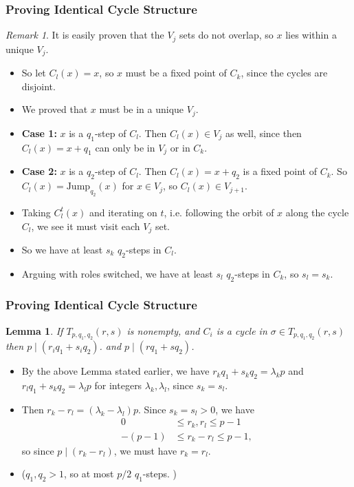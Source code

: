 \documentclass{beamer}
\theoremstyle{plain}
\newtheorem{lem}[theorem]{Lemma}
\theoremstyle{definition}
\theoremstyle{remark}
\newtheorem{rem}[theorem]{Remark}
\newcommand{\bee}{\begin{equation}\begin{aligned}}
\newcommand{\eee}{\end{aligned}\end{equation}}
\renewcommand{\leq}{\leqslant}			%
\renewcommand{\'}{\hspace{0.5mm}'}		%
\begin{document}

\begin{frame}
\frametitle{Proving Identical Cycle Structure}
	
	\begin{rem}
		It is easily proven that the $V_j$ sets do not 
		overlap, so $x$ lies within a unique $V_j$. 
	\end{rem}
	\begin{itemize}
		\item So let $C_l(x) = x$, so $x$ must be a fixed
		point of $C_k$, since the cycles are disjoint. 
		\item We proved that $x$ must be in a unique $V_j$. 
		\item \textbf{Case 1:} $x$ is a $q_1$-step of $C_l$. 
		Then $C_l(x) \in V_j$ as well, since then 
		$C_l(x) = x + q_1$ can only be in $V_j$ or in $C_k$. 
		\item \textbf{Case 2:} $x$ is a $q_2$-step of $C_l$. 
		Then $C_l(x) = x + q_2$ is a fixed point of $C_k$. 
		So $C_l(x) = \mathrm{Jump}_{q_2}(x)$ for $x \in V_j$, 
		so $C_l(x) \in V_{j + 1}$. 
		\item Taking $C_l^t(x)$ and iterating on $t$, 
		i.e. following the orbit of $x$ along the cycle
		$C_l$, we see it must visit each $V_j$ set. 
		\item 
		So we have at least $s_k$ $q_2$-steps in $C_l$.
		
		\item Arguing with roles switched, we have
		at least $s_l$ $q_2$-steps in $C_k$, so $s_l = s_k$. 
	\end{itemize}

\end{frame}



\begin{frame}
\frametitle{Proving Identical Cycle Structure}
	
	\begin{lem}
		If $T_{p,q_1,q_2}(r,s)$ is nonempty, 
		and $C_i$ is a cycle in $\sigma \in T_{p,q_1,q_2}(r,s)$
		then $p \mid (r_iq_1 + s_iq_2)$. 
		and $p \mid (rq_1 + sq_2)$. 
	\end{lem}
	\begin{itemize}
		\item By the above Lemma stated earlier, we have
		$r_kq_1 + s_kq_2 = \lambda_kp$ and 
		$r_lq_1 + s_kq_2 = \lambda_l p$ 
		for integers $\lambda_k,\lambda_l$, since $s_k = s_l$. 
		\item Then $r_k - r_l = (\lambda_k - \lambda_l)p$. 
		Since $s_k = s_l > 0$, we have
		\bee
			0 &\leq r_k,r_l \leq p - 1\\
			-(p - 1) &\leq r_k - r_l \leq p - 1,
		\eee
		so since $p \mid (r_k - r_l)$, we must have $r_k = r_l$. 
		\item ($q_1,q_2 > 1$, so at most $p/2$ $q_1$-steps. )
		
	\end{itemize}

\end{frame}
\end{document}
